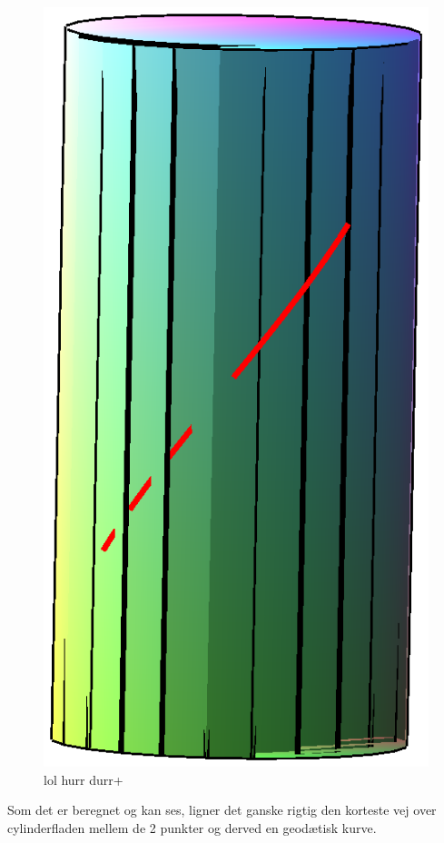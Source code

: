\begin{figure}[hb]
\center
\includegraphics[scale=0.4]{pictures/Opg8_Fig1.eps}
\caption{lol hurr durr+}
\end{figure}
Som det er beregnet og kan ses, ligner det ganske rigtig den korteste vej over cylinderfladen mellem de 2 punkter og derved en geodætisk kurve.
\\
\\
\\

